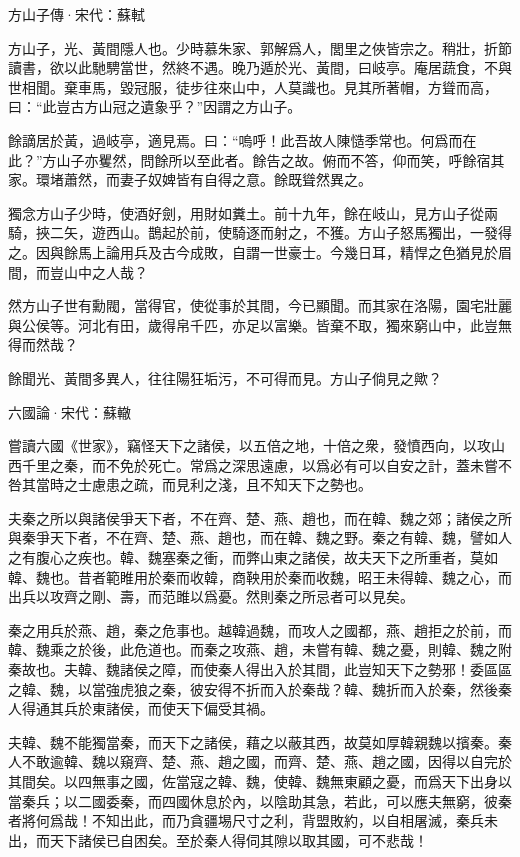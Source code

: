 \documentclass[12pt,a4paper]{ctexbook}
\begin{document}
方山子傳·宋代：蘇軾 \par
方山子，光、黃間隱人也。少時慕朱家、郭解爲人，閭里之俠皆宗之。稍壯，折節讀書，欲以此馳騁當世，然終不遇。晚乃遁於光、黃間，曰岐亭。庵居蔬食，不與世相聞。棄車馬，毀冠服，徒步往來山中，人莫識也。見其所著帽，方聳而高，曰：“此豈古方山冠之遺象乎？”因謂之方山子。\par
餘謫居於黃，過岐亭，適見焉。曰：“嗚呼！此吾故人陳慥季常也。何爲而在此？”方山子亦矍然，問餘所以至此者。餘告之故。俯而不答，仰而笑，呼餘宿其家。環堵蕭然，而妻子奴婢皆有自得之意。餘既聳然異之。\par
獨念方山子少時，使酒好劍，用財如糞土。前十九年，餘在岐山，見方山子從兩騎，挾二矢，遊西山。鵲起於前，使騎逐而射之，不獲。方山子怒馬獨出，一發得之。因與餘馬上論用兵及古今成敗，自謂一世豪士。今幾日耳，精悍之色猶見於眉間，而豈山中之人哉？\par
然方山子世有勳閥，當得官，使從事於其間，今已顯聞。而其家在洛陽，園宅壯麗與公侯等。河北有田，歲得帛千匹，亦足以富樂。皆棄不取，獨來窮山中，此豈無得而然哉？\par
餘聞光、黃間多異人，往往陽狂垢污，不可得而見。方山子倘見之歟？\par
六國論·宋代：蘇轍 \par
嘗讀六國《世家》，竊怪天下之諸侯，以五倍之地，十倍之衆，發憤西向，以攻山西千里之秦，而不免於死亡。常爲之深思遠慮，以爲必有可以自安之計，蓋未嘗不咎其當時之士慮患之疏，而見利之淺，且不知天下之勢也。\par
夫秦之所以與諸侯爭天下者，不在齊、楚、燕、趙也，而在韓、魏之郊；諸侯之所與秦爭天下者，不在齊、楚、燕、趙也，而在韓、魏之野。秦之有韓、魏，譬如人之有腹心之疾也。韓、魏塞秦之衝，而弊山東之諸侯，故夫天下之所重者，莫如韓、魏也。昔者範睢用於秦而收韓，商鞅用於秦而收魏，昭王未得韓、魏之心，而出兵以攻齊之剛、壽，而范雎以爲憂。然則秦之所忌者可以見矣。\par
秦之用兵於燕、趙，秦之危事也。越韓過魏，而攻人之國都，燕、趙拒之於前，而韓、魏乘之於後，此危道也。而秦之攻燕、趙，未嘗有韓、魏之憂，則韓、魏之附秦故也。夫韓、魏諸侯之障，而使秦人得出入於其間，此豈知天下之勢邪！委區區之韓、魏，以當強虎狼之秦，彼安得不折而入於秦哉？韓、魏折而入於秦，然後秦人得通其兵於東諸侯，而使天下偏受其禍。\par
夫韓、魏不能獨當秦，而天下之諸侯，藉之以蔽其西，故莫如厚韓親魏以擯秦。秦人不敢逾韓、魏以窺齊、楚、燕、趙之國，而齊、楚、燕、趙之國，因得以自完於其間矣。以四無事之國，佐當寇之韓、魏，使韓、魏無東顧之憂，而爲天下出身以當秦兵；以二國委秦，而四國休息於內，以陰助其急，若此，可以應夫無窮，彼秦者將何爲哉！不知出此，而乃貪疆埸尺寸之利，背盟敗約，以自相屠滅，秦兵未出，而天下諸侯已自困矣。至於秦人得伺其隙以取其國，可不悲哉！\par
\end{document}

